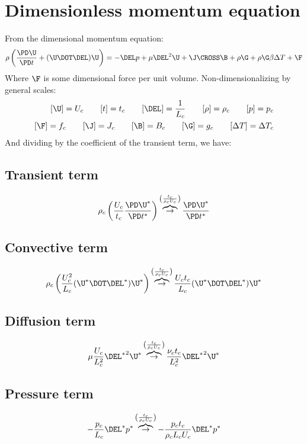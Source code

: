 \documentclass[11pt]{article}
\newcommand{\OB}{\overbrace{\rightarrow}^{\left(\frac{t_c}{\rho_c U_c}\right)}}
\begin{document}
\doublespacing
\MOONSTITLE
\maketitle

\section{Dimensionless momentum equation}
From the dimensional momentum equation:
\begin{equation}
	\rho \left( \frac{\PD \U}{\PD t} + (\U \DOT \DEL) \U \right) =
	-\DEL p + \mu \DEL^2 \U + \J \CROSS \B + \rho \G + \rho \G \beta \Delta T + \F
\end{equation}
Where $\F$ is some dimensional force per unit volume. Non-dimensionalizing by general scales:
\begin{equation}\begin{aligned}
	[\U] = U_c \qquad
	[t] = t_c \qquad
	[\DEL] = \frac{1}{L_c} \qquad
	[\rho] = \rho_c \qquad
	[p] = p_c \\
	[\F] = f_c \qquad
	[\J] = J_c \qquad
	[\B] = B_c \qquad
	[\G] = g_c \qquad
	[\Delta T] = \Delta T_c
\end{aligned}\end{equation}
And dividing by the coefficient of the transient term, we have:
\subsection{Transient term}
\begin{equation}
	\rho_c \left( \frac{U_c}{t_c} \frac{\PD \U^*}{\PD t^*} \right)
	\OB
	\frac{\PD \U^*}{\PD t^*}
\end{equation}
\subsection{Convective term}
\begin{equation}
	\rho_c \left( \frac{U_c^2}{L_c} (\U^* \DOT \DEL^*) \U^* \right)
	\OB
	\frac{U_c t_c}{L_c} (\U^* \DOT \DEL^*) \U^*
\end{equation}
\subsection{Diffusion term}
\begin{equation}
	\mu \frac{U_c}{L_c^2} {\DEL^*}^2 \U^*
	\OB
	\frac{\nu_c t_c}{L_c^2} {\DEL^*}^2 \U^*
\end{equation}
\subsection{Pressure term}
\begin{equation}
	- \frac{p_c}{L_c} \DEL^*  p^*
	\OB
	- \frac{p_c t_c}{\rho_c L_c U_c} \DEL^*  p^*
\end{equation}
\end{document}
